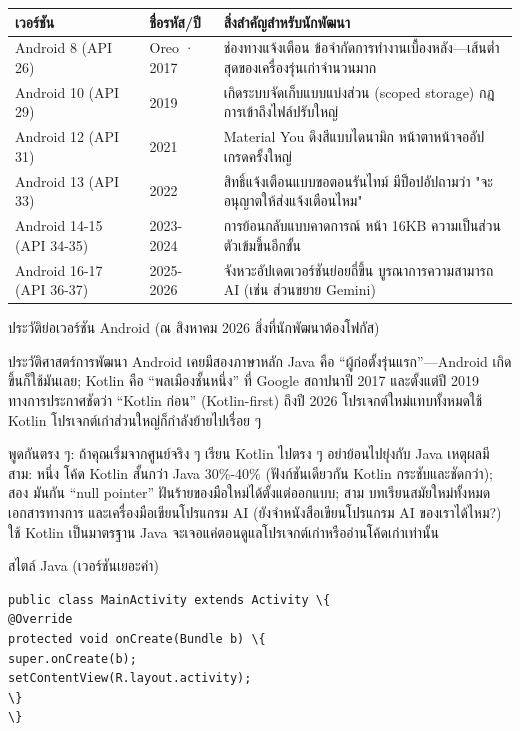 \begin{center}
\begin{tabularx}{\linewidth}{|X|X|X|}
\hline
\textbf{เวอร์ชัน} & \textbf{ชื่อรหัส/ปี} & \textbf{สิ่งสำคัญสำหรับนักพัฒนา} \tabularnewline
\hline
Android 8 (API 26) & Oreo · 2017 & ช่องทางแจ้งเตือน ข้อจำกัดการทำงานเบื้องหลัง—เส้นต่ำสุดของเครื่องรุ่นเก่าจำนวนมาก \tabularnewline
Android 10 (API 29) & 2019 & เกิดระบบจัดเก็บแบบแบ่งส่วน (scoped storage) กฎการเข้าถึงไฟล์ปรับใหญ่ \tabularnewline
Android 12 (API 31) & 2021 & Material You ดึงสีแบบไดนามิก หน้าตาหน้าจออัปเกรดครั้งใหญ่ \tabularnewline
Android 13 (API 33) & 2022 & สิทธิ์แจ้งเตือนแบบขอตอนรันไทม์ มีป็อปอัปถามว่า "จะอนุญาตให้ส่งแจ้งเตือนไหม" \tabularnewline
Android 14-15 (API 34-35) & 2023-2024 & การย้อนกลับแบบคาดการณ์ หน้า 16KB ความเป็นส่วนตัวเข้มขึ้นอีกขั้น \tabularnewline
Android 16-17 (API 36-37) & 2025-2026 & จังหวะอัปเดตเวอร์ชันย่อยถี่ขึ้น บูรณาการความสามารถ AI (เช่น ส่วนขยาย Gemini) \tabularnewline
\hline
\end{tabularx}
\end{center}

\begin{center}\small\color{gray}ประวัติย่อเวอร์ชัน Android (ณ สิงหาคม 2026 สิ่งที่นักพัฒนาต้องโฟกัส)\end{center}


ประวัติศาสตร์การพัฒนา Android เคยมีสองภาษาหลัก Java คือ “ผู้ก่อตั้งรุ่นแรก”—Android เกิดขึ้นก็ใช้มันเลย; Kotlin คือ “พลเมืองชั้นหนึ่ง” ที่ Google สถาปนาปี 2017 และตั้งแต่ปี 2019 ทางการประกาศชัดว่า “Kotlin ก่อน” (Kotlin-first) ถึงปี 2026 โปรเจกต์ใหม่แทบทั้งหมดใช้ Kotlin โปรเจกต์เก่าส่วนใหญ่ก็กำลังย้ายไปเรื่อย ๆ

พูดกันตรง ๆ: ถ้าคุณเริ่มจากศูนย์จริง ๆ เรียน Kotlin ไปตรง ๆ อย่าย้อนไปยุ่งกับ Java เหตุผลมีสาม: หนึ่ง โค้ด Kotlin สั้นกว่า Java 30\%-40\% (ฟังก์ชันเดียวกัน Kotlin กระชับและชัดกว่า); สอง มันกัน “null pointer” ฝันร้ายของมือใหม่ได้ตั้งแต่ออกแบบ; สาม บทเรียนสมัยใหม่ทั้งหมด เอกสารทางการ และเครื่องมือเขียนโปรแกรม AI (ยังจำหนังสือเขียนโปรแกรม AI ของเราได้ไหม?) ใช้ Kotlin เป็นมาตรฐาน Java จะเจอแค่ตอนดูแลโปรเจกต์เก่าหรืออ่านโค้ดเก่าเท่านั้น

สไตล์ Java (เวอร์ชันเยอะคำ)

\begin{lstlisting}
public class MainActivity extends Activity \{
@Override
protected void onCreate(Bundle b) \{
super.onCreate(b);
setContentView(R.layout.activity);
\}
\}
\end{lstlisting}

